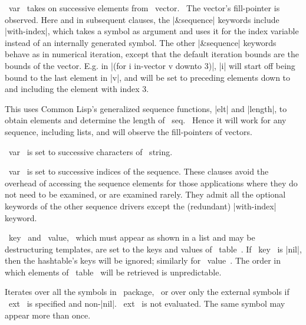\begin{clauses}
~var~ takes on successive elements from ~vector.~   The vector's
fill-pointer is observed.  Here and in subsequent clauses, the |\&sequence|
keywords include |with-index|, which takes a symbol as argument
and uses it for the index variable instead of an internally generated
symbol.  The other |\&sequence| keywords behave as in numerical
iteration, except that the default iteration bounds are the bounds of
the vector.  E.g. in |(for i in-vector v downto 3)|,
|i| will start off being bound to the last element in |v|,
and will  
be set to preceding elements down to and including the element with
index 3.

This uses Common Lisp's generalized sequence functions, |elt|
and |length|, to obtain elements and determine the length of
~seq.~   Hence it will work for any sequence, including lists, and will
observe the fill-pointers of vectors.

~var~ is set to successive characters of ~string.~

\startitem
{}
\finishitem
~var~ is set to successive indices of the sequence.
These clauses avoid the overhead of accessing the sequence elements
for those applications where they do not need to be examined, or are
examined rarely.  They admit all the optional keywords of the other
sequence drivers except the (redundant) |with-index| keyword.


~key~ and ~value,~ which must appear as shown in a list
and may be destructuring templates, are set to the keys and values of
~table~.  If ~key~ is |nil|, then the hashtable's keys will be ignored;
similarly for ~value~.
The order in which 
elements of ~table~ will be retrieved is unpredictable.

Iterates over all the symbols in ~package,~ or over only the
external symbols if ~ext~ is specified and non-|nil|.  ~ext~ is not
evaluated.  The same symbol may appear more than once.


\end{clauses}
